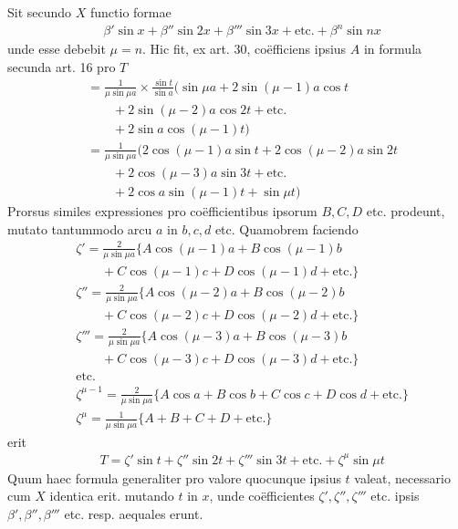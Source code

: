 Sit secundo $X$ functio formae
\[
\begin{aligned}
&\beta'\sin x+\beta''\sin2x+\beta'''\sin3x+\text{etc.}+\beta^n\sin nx
\end{aligned}
\]
unde esse debebit $\mu=n$. Hic fit, ex art. 30, coëfficiens ipsius $A$ in formula
secunda art. 16 pro $T$
\[
\begin{aligned}
&=\frac{1}{\mu\sin\mu a}\times\frac{\sin t}{\sin a}(\sin\mu a+2\sin(\mu-1)a\cos t\\[5pt]
&\qquad{}+2\sin(\mu-2)a\cos2t+\text{etc.}\\[5pt]
&\qquad+2\sin a\cos(\mu-1)t)\\[5pt]
&=\frac{1}{\mu\sin\mu a}(2\cos(\mu-1)a\sin t+2\cos(\mu-2)a\sin2t\\[5pt]
&\qquad{}+2\cos(\mu-3)a\sin3t+\text{etc.}\\[5pt]
&\qquad+2\cos a\sin(\mu-1)t+\sin\mu t)
\end{aligned}
\]
Prorsus similes expressiones pro coëfficientibus ipsorum $B,C,D$ etc. prodeunt,
mutato tantummodo arcu $a$ in $b,c,d$ etc. Quamobrem faciendo
\[
\begin{aligned}
&\zeta'=\frac{2}{\mu\sin\mu a}\{A\cos(\mu-1)a+B\cos(\mu-1)b\\[5pt]
&\qquad{}+C\cos(\mu-1)c+D\cos(\mu-1)d+\text{etc.}\}\\[5pt]
&\zeta''=\frac{2}{\mu\sin\mu a}\{A\cos(\mu-2)a+B\cos(\mu-2)b\\[5pt]
&\qquad{}+C\cos(\mu-2)c+D\cos(\mu-2)d+\text{etc.}\}\\[5pt]
&\zeta'''=\frac{2}{\mu\sin\mu a}\{A\cos(\mu-3)a+B\cos(\mu-3)b\\[5pt]
&\qquad{}+C\cos(\mu-3)c+D\cos(\mu-3)d+\text{etc.}\}\\[5pt]
&\text{etc.}\\[5pt]
&\zeta^{\mu-1}=\frac{2}{\mu\sin\mu a}\{A\cos a+B\cos b+C\cos c+D\cos d+\text{etc.}\}\\[5pt]
&\zeta^\mu=\frac{1}{\mu\sin\mu a}\{A+B+C+D+\text{etc.}\}
\end{aligned}
\]
erit
\[
\begin{aligned}
&T=\zeta'\sin t+\zeta''\sin2t+\zeta'''\sin3t+\text{etc.}+\zeta^\mu\sin\mu t
\end{aligned}
\]
Quum haec formula generaliter pro valore quocunque ipsius $t$ valeat, necessario
cum $X$ identica erit. mutando $t$ in $x$, unde coëfficientes $\zeta',\zeta'',\zeta'''$ etc. ipsis $\beta',\beta'',\beta'''$ etc. resp. aequales erunt.

